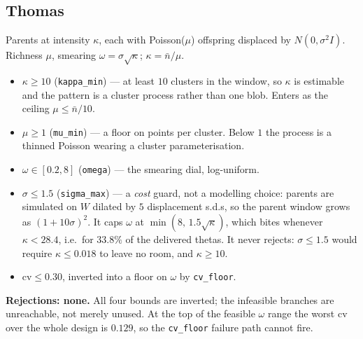\documentclass[11pt]{article}
\newcommand{\nb}{\bar n}
\newcommand{\code}[1]{\texttt{#1}}
\begin{document}
\subsection*{Thomas}
Parents at intensity $\kappa$, each with Poisson($\mu$) offspring displaced by $N(0,\sigma^2I)$. Richness $\mu$, smearing $\omega=\sigma\sqrt\kappa$; $\kappa=\nb/\mu$.
\begin{itemize}
  \item $\kappa\ge10$ (\code{kappa\_min}) --- at least $10$ clusters in the window, so $\kappa$ is estimable and the pattern is a cluster process rather than one blob. Enters as the ceiling $\mu\le\nb/10$.
  \item $\mu\ge1$ (\code{mu\_min}) --- a floor on points per cluster. Below $1$ the process is a thinned Poisson wearing a cluster parameterisation.
  \item $\omega\in[0.2,8]$ (\code{omega}) --- the smearing dial, log-uniform.
  \item $\sigma\le1.5$ (\code{sigma\_max}) --- a \emph{cost} guard, not a modelling choice: parents are simulated on $W$ dilated by $5$ displacement s.d.s, so the parent window grows as $(1+10\sigma)^2$. It caps $\omega$ at $\min(8,\,1.5\sqrt\kappa)$, which bites whenever $\kappa<28.4$, i.e.\ for $33.8\%$ of the delivered thetas. It never rejects: $\sigma\le1.5$ would require $\kappa\le0.018$ to leave no room, and $\kappa\ge10$.
  \item $\mathrm{cv}\le0.30$, inverted into a floor on $\omega$ by \code{cv\_floor}.
\end{itemize}
\textbf{Rejections: none.} All four bounds are inverted; the infeasible branches are unreachable, not merely unused. At the top of the feasible $\omega$ range the worst cv over the whole design is $0.129$, so the \code{cv\_floor} failure path cannot fire.
\end{document}

